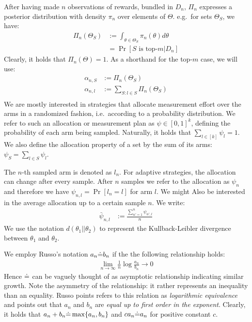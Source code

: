 After having made $n$ observations of rewards, bundled in $D_n$, $\Pi_n$
expresses a posterior distribution with density $\pi_n$ over elements of
$\Theta$. e.g.\ for sets $\Theta_{S}$, we have:
\begin{align}
  \Pi_n(\Theta_{S}) &:= \int_{\theta \in \Theta_{S}} \pi_n(\theta)
      d\theta \\
    &= \Pr[S \text{ is top-}m | D_n]
\end{align}
Clearly, it holds that $\Pi_n(\Theta) = 1$. As a shorthand for the top-$m$ case, we will use:
\begin{align}
  \alpha_{n, S} &:= \Pi_n(\Theta_{S}) \\
  \alpha_{n, l} &:= \sum_{S: l \in S} \Pi_n(\Theta_{S}) \\
\end{align}
We are mostly interested in strategies that allocate measurement effort over the
arms in a randomized fashion, i.e.\ according to a probability distribution. We
refer to such an allocation or measurement plan as $\psi \in [0, 1]^k$, defining
the probability of each arm being sampled. Naturally, it holds that $\sum_{l \in
[k]} \psi_l = 1$. We also define the allocation property of a set by the sum of
its arms: $\psi_S = \sum_{l \in S} \psi_l$.

The $n$-th sampled arm is denoted as $l_n$. For adaptive strategies, the
allocation can change after every sample. After $n$ samples we refer to the
allocation as $\psi_{n}$ and therefore we have $\psi_{n, l} = \Pr[l_n = l]$ for
arm $l$. We might Also be interested in the average allocation up to a
certain sample $n$. We write:
\begin{align}
  \bar{\psi}_{n, l} &:= \frac{\sum_{n' = 1}^{n} \psi_{n', l}}{n}
\end{align}
We use the notation $d(\theta_1||\theta_2)$ to represent the Kullback-Leibler
divergence between $\theta_1$ and $\theta_2$.

We employ Russo's notation $a_n \dot{=} b_n$ if the the following relationship
holds:
\begin{align}
  \lim_{n \rightarrow \infty}\frac{1}{n}\log{\frac{a_n}{b_n}} \rightarrow 0
\end{align}
Hence $\dot{=}$ can be vaguely thought of as asymptotic relationship indicating
similar growth. Note the asymmetry of the relationship: it rather
represents an inequality than an equality. Russo points refers to this relation as \emph{logarithmic equivalence} and points out that $a_n$ and $b_n$ are \emph{equal up to first order in the exponent}. Clearly, it holds that $a_n + b_n \dot{=} \max\{a_n, b_n\}$ and $c a_n \dot{=} a_n$ for positive constant $c$.

